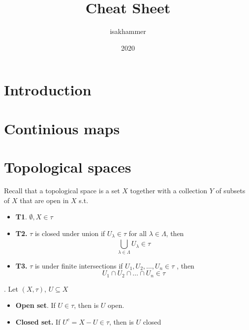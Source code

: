 \documentclass{article}
\title{Cheat Sheet}
\author{isakhammer }
\date{2020}
\theoremstyle{remark}
\begin{document}
\maketitle



\section{ Introduction}%
\label{sec:Ch1}

\section{ Continious maps}%
\label{sec:continious_maps}

\section{ Topological spaces}%
\label{sec:Ch3}

\begin{definition} Recall that a topological space is a set $X$ together with a collection $Y$ of subsets
    of $X$ that are open in $X$ s.t.
    \begin{itemize}
        \item \textbf{T1}.  $ \emptyset , X \in  \tau $
        \item \textbf{T2.} $ \tau $ is closed under union if $U_{\lambda } \in  \tau $ for all $\lambda  \in \Lambda $, then \[
                \bigcup_{\lambda  \in  \Lambda }^{} U_{\lambda } \in \tau
        \]
    \item \textbf{T3.} $\tau  $ is under finite intersections if $U_{1}, U_{2}, \ldots, U_{n} \in \tau $ , then \[
    U_{1} \cap U_{2} \cap \ldots \cap  U_{n} \in \tau
    \]

    \end{itemize}
\end{definition}

\begin{definition}
    . Let $\left( X, \tau  \right)$, $U \subseteq X$
    \begin{itemize}
        \item
\textbf{Open set}.  If $ U \in \tau $, then is $U$ open.
    \item \textbf{Closed set.}  If $U^{c} = X- U \in \tau $, then is $U$ closed
    \end{itemize}
\end{definition}
\end{document}
